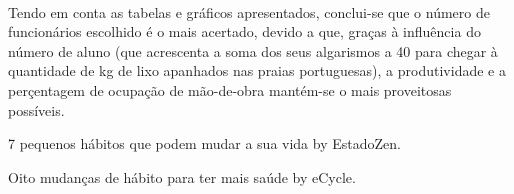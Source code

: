 \documentclass[11pt,a4paper]{report}
\begin{document}
\paragraph{}
Tendo em conta as tabelas e gráficos apresentados, conclui-se que o número de funcionários escolhido é o mais acertado, devido a que, graças à influência do número de aluno (que acrescenta a soma dos seus algarismos a 40 para chegar à quantidade de kg de lixo apanhados nas praias portuguesas), a produtividade e a perçentagem de ocupação de mão-de-obra mantém-se o mais proveitosas possíveis.  
\begin{thebibliography}{}
7 pequenos hábitos que podem mudar a sua vida by EstadoZen.\par
[https://estadozen.com/artigos/7-pequenos-habitos-que-podem-mudar-sua-vida]
Oito mudanças de hábito para ter mais saúde by eCycle.\par
[https://www.ecycle.com.br/3371-mudancas-de-habitos]
\end{thebibliography}
\end{document}
